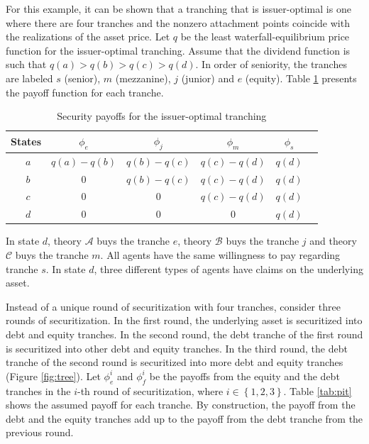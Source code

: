 \documentclass[11pt]{article}
\theoremstyle{plain}
\begin{document}
For this example, it can be shown that a tranching that is issuer-optimal is one where there are four tranches and the nonzero attachment points coincide with the realizations of the asset price. Let $q$ be the least waterfall-equilibrium price function for the issuer-optimal tranching. Assume that the dividend function is such that $q(a)>q(b)>q(c)>q(d)$. In order of seniority, the tranches are labeled $s$ (senior), $m$ (mezzanine), $j$ (junior) and $e$ (equity). Table \ref{tab:ptr} presents the payoff function for each tranche.

\begin{table}
\caption{Security payoffs for the issuer-optimal tranching}
\label{tab:ptr}
\centering
\begin{tabular}{crrrrc}
\hline
States & \multicolumn{1}{c}{$\phi_e$} & \multicolumn{1}{c}{$\phi_j$} & \multicolumn{1}{c}{$\phi_m$} & \multicolumn{1}{c}{$\phi_s$} \\
\hline
$~~a$ & $q(a)-q(b)$             & $q(b)-q(c)$ & $q(c)-q(d)$ & $q(d)$ \\
$~~b$ & \multicolumn{1}{c}{$0$} & $q(b)-q(c)$ & $q(c)-q(d)$ & $q(d)$ \\
$~~c$ & \multicolumn{1}{c}{$0$} & \multicolumn{1}{c}{$0$} & $q(c)-q(d)$ & $q(d)$ \\
$~~d$ & \multicolumn{1}{c}{$0$} & \multicolumn{1}{c}{$0$} & \multicolumn{1}{c}{$0$} & $q(d)$ \\
 \hline
\end{tabular}
\end{table}

In state $d$, theory $\mathcal{A}$ buys the tranche $e$,  theory $\mathcal{B}$ buys the tranche $j$ and  theory $\mathcal{C}$ buys the tranche $m$. All agents have the same willingness to pay regarding tranche $s$. In state $d$, three different types of agents have claims on the underlying asset.

Instead of a unique round of securitization with four tranches, consider three rounds of securitization. In the first round, the underlying asset is securitized into debt and equity tranches. In the second round, the debt tranche of the first round is securitized into other debt and equity tranches. In the third round, the debt tranche of the second round is securitized into more debt and equity tranches (Figure \ref{fig:tree}). Let $\phi^i_e$ and $\phi^i_f$ be the payoffs from the equity and the debt tranches in the $i$-th round of securitization, where $i\in\left\{1,2,3\right\}$. Table \ref{tab:pit} shows the assumed payoff for each tranche. By construction, the payoff from the debt and the equity tranches add up to the payoff from the debt tranche from the previous round.
\end{document}
